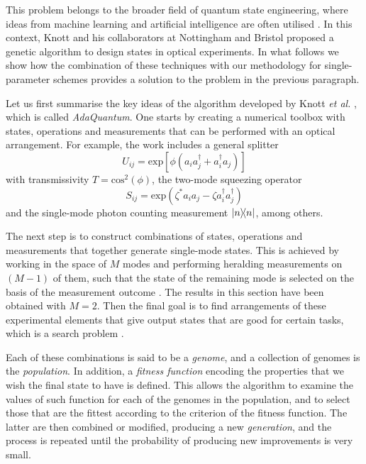 This problem belongs to the broader field of quantum state engineering, where ideas from machine learning and artificial intelligence are often utilised \cite{knott2016, jesus2018dec, driscoll2019}. In this context, Knott and his collaborators at Nottingham and Bristol \cite{jesus2018dec} proposed a genetic algorithm to design states in optical experiments. In what follows we show how the combination of these techniques with our methodology for single-parameter schemes provides a solution to the problem in the previous paragraph.

Let us first summarise the key ideas of the algorithm developed by Knott \emph{et al.} \cite{jesus2018dec}, which is called \emph{AdaQuantum}. One starts by creating a numerical toolbox with states, operations and measurements that can be performed with an optical arrangement. For example, the work \cite{jesus2018dec} includes a general splitter 
\begin{equation}
U_{ij}=\mathrm{exp}\left[\phi \left( a_i a_j^\dagger + a_i^\dagger a_j \right)\right]
\end{equation}
with transmissivity $T = \mathrm{cos}^2(\phi)$, the two-mode squeezing operator
\begin{equation}
S_{ij}=\mathrm{exp}\left(\zeta^{*}a_i a_j - \zeta a_i^\dagger a_j^\dagger\right)
\end{equation}
and the single-mode photon counting measurement $\ketbra{n}$, among others. 

The next step is to construct combinations of states, operations and measurements that together generate single-mode states. This is achieved by working in the space of $M$ modes and performing heralding measurements on $(M-1)$ of them, such that the state of the remaining mode is selected on the basis of the measurement outcome \cite{knott2016}. The results in this section have been obtained with $M = 2$. Then the final goal is to find arrangements of these experimental elements that give output states that are good for certain tasks, which is a search problem \cite{jesus2018dec}. 

Each of these combinations is said to be a \emph{genome}, and a collection of genomes is the \emph{population}. In addition, a \emph{fitness function} encoding the properties that we wish the final state to have is defined. This allows the algorithm to examine the values of such function for each of the genomes in the population, and to select those that are the fittest according to the criterion of the fitness function. The latter are then combined or modified, producing a new \emph{generation}, and the process is repeated until the probability of producing new improvements is very small.  

